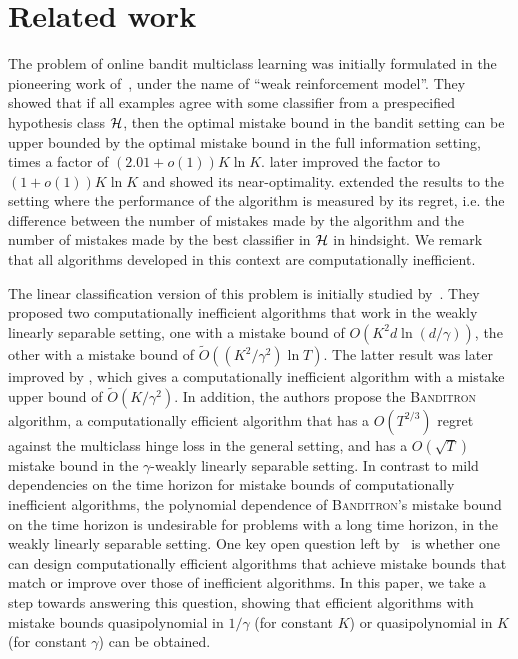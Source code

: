 \section{Related work}
\label{section:related-work}

The problem of online bandit multiclass learning was initially formulated in the
pioneering work of~\citet{Auer-Long-1999}, under the name of ``weak
reinforcement model''. They showed that if all examples agree with some
classifier from a prespecified hypothesis class $\mathcal{H}$, then the optimal
mistake bound in the bandit setting can be upper bounded by the optimal mistake
bound in the full information setting, times a factor of $(2.01 + o(1))K \ln K$.
\citet{Long-2017} later improved the factor to $(1 + o(1)) K \ln K$ and showed
its near-optimality. \citet{Daniely-Helbertal-2013} extended the results to the
setting where the performance of the algorithm is measured by its regret, i.e.
the difference between the number of mistakes made by the algorithm and the
number of mistakes made by the best classifier in $\mathcal{H}$ in hindsight.
We remark that
all algorithms developed in this context are computationally inefficient.

The linear classification version of this problem is initially studied
by~\citet{Kakade-Shalev-Shwartz-Tewari-2008}. They proposed two computationally
inefficient algorithms that work in the weakly linearly separable setting, one
with a mistake bound of
$O(K^2 d \ln(d/\gamma))$,
the other with a
mistake bound of $\widetilde{O}((K^2/\gamma^2) \ln T)$. The latter result
was later improved by \citet{Daniely-Helbertal-2013}, which gives a
computationally inefficient algorithm with a mistake upper bound of
$\widetilde{O}(K/\gamma^2)$.
In addition, the authors propose the
\textsc{Banditron} algorithm, a computationally efficient algorithm that has a
$O(T^{2/3})$ regret against the multiclass hinge loss in the general setting,
and has a $O(\sqrt{T})$ mistake bound in the $\gamma$-weakly linearly separable
setting.
In contrast to mild dependencies on the time horizon for mistake bounds of
computationally inefficient algorithms,
the polynomial dependence of \textsc{Banditron}'s mistake bound on the
time horizon is undesirable for problems with a long time horizon, in the
weakly linearly separable setting. One key open
question left by~\citet{Kakade-Shalev-Shwartz-Tewari-2008} is whether one can
design computationally efficient algorithms that achieve mistake bounds that
match or improve over those of inefficient algorithms. In this paper, we take a
step towards answering this question, showing that efficient algorithms with
mistake bounds quasipolynomial in $1/\gamma$ (for constant $K$)
or quasipolynomial in $K$ (for constant $\gamma$) can be obtained.


